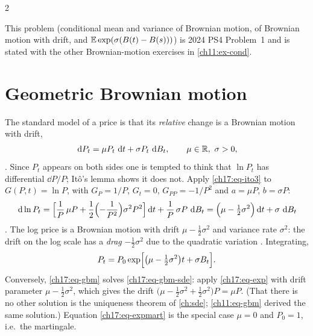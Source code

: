 \begin{paracol}{2}
\begin{exercise}[PS8 (2013), Problem A-2]\label{ch17:ex-a2}
This problem (conditional mean and variance of Brownian motion, of Brownian motion with drift, and $\mathbb{E}\exp(\sigma(B(t)-B(s)))$) is 2024 PS4 Problem~1 and is stated with the other Brownian-motion exercises in \cref{ch11:ex-cond}.
\end{exercise}

\section{Geometric Brownian motion}\label{ch17:sec-gbm}

The standard model of a price is that its \emph{relative} change is a Brownian motion with drift,
\begin{equation}\label{ch17:eq-gbm-sde}
  \dd P_t=\mu P_t\,\dd t+\sigma P_t\,\dd B_t,\qquad \mu\in\R,\ \sigma>0,
\end{equation}
. Since $P_t$ appears on both sides one is tempted to think that $\ln P_t$ has differential $\dd P/P$; It\^o's lemma shows it does not. Apply \eqref{ch17:eq-ito3} to
$G(P,t)=\ln P$, with $G_P=1/P$, $G_t=0$, $G_{PP}=-1/P^2$ and $a=\mu P$, $b=\sigma P$:
\begin{equation}\label{ch17:eq-logp}
  \,\mathrm{d}\ln P_t=\Bigl[\frac1P\,\mu P+\frac12\Bigl(-\frac1{P^2}\Bigr)\sigma^2P^2\Bigr]\,\mathrm{d} t+\frac1P\,\sigma P\,\,\mathrm{d} B_t=\Bigl(\mu-\tfrac12\sigma^2\Bigr)\,\mathrm{d} t+\sigma\,\,\mathrm{d} B_t
\end{equation}
. The log price is a Brownian motion with drift $\mu-\tfrac12\sigma^2$ and variance rate $\sigma^2$: the drift on the log scale has a \emph{drag} $-\tfrac12\sigma^2$ due to the quadratic variation
. Integrating,
\begin{equation}\label{ch17:eq-gbm}
  P_t=P_0\exp\Bigl[\bigl(\mu-\tfrac12\sigma^2\bigr)t+\sigma B_t\Bigr].
\end{equation}
Conversely, \eqref{ch17:eq-gbm} solves \eqref{ch17:eq-gbm-sde}: apply \eqref{ch17:eq-exp} with drift parameter $\mu-\tfrac12\sigma^2$, which gives the drift $\bigl(\mu-\tfrac12\sigma^2+\tfrac12\sigma^2\bigr)P=\mu P$. (That there is no other solution is the uniqueness theorem of \cref{ch:sde}; \cref{ch11:eq-gbm} derived the same solution.)
Equation \eqref{ch17:eq-expmart} is the special case $\mu=0$ and $P_0=1$, i.e.\ the martingale.


\end{paracol}
